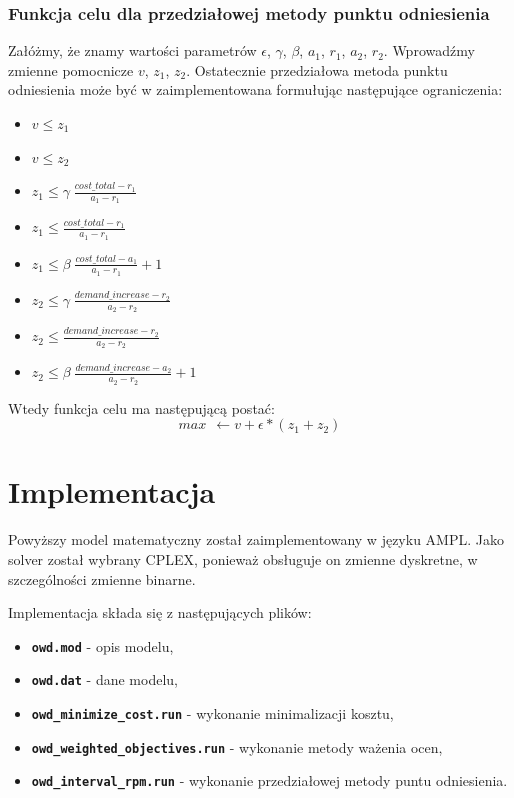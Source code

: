 \documentclass[12pt, twoside, hidelinks, a4paper]{article}
\begin{document}
\subsubsection{Funkcja celu dla przedziałowej metody punktu odniesienia}
Załóżmy, że znamy wartości parametrów $\epsilon$, $\gamma$, $\beta$, $a_1$, $r_1$, $a_2$, $r_2$. Wprowadźmy zmienne pomocnicze $v$, $z_1$, $z_2$. Ostatecznie przedziałowa metoda punktu odniesienia może być w zaimplementowana formułując następujące ograniczenia:
\begin{itemize}
\item $v \leqslant z_1$
\item $v \leqslant z_2$
\item $z_1 \leqslant \gamma \; \frac{cost\_total - r_1}{a_1 - r_1}$
\item $z_1 \leqslant \frac{cost\_total - r_1}{a_1 - r_1}$
\item $z_1 \leqslant \beta \; \frac{cost\_total - a_1}{a_1 - r_1} + 1$
\item $z_2 \leqslant \gamma \; \frac{demand\_increase - r_2}{a_2 - r_2}$
\item $z_2 \leqslant \frac{demand\_increase - r_2}{a_2 - r_2}$
\item $z_2 \leqslant \beta \; \frac{demand\_increase - a_2}{a_2 - r_2} + 1$
\end{itemize}
Wtedy funkcja celu ma następującą postać:
$$max \: \: \leftarrow v + \epsilon * (z_1 + z_2)$$

\section{Implementacja}
Powyższy model matematyczny został zaimplementowany w języku AMPL. Jako solver został wybrany CPLEX, ponieważ obsługuje on zmienne dyskretne, w szczególności zmienne binarne.

Implementacja składa się z następujących plików:
\begin{itemize}
\item \textbf{\texttt{owd.mod}} - opis modelu,
\item \textbf{\texttt{owd.dat}} - dane modelu,
\item \textbf{\texttt{owd\_minimize\_cost.run}} - wykonanie minimalizacji kosztu,
\item \textbf{\texttt{owd\_weighted\_objectives.run}} - wykonanie metody ważenia ocen,
\item \textbf{\texttt{owd\_interval\_rpm.run}} - wykonanie przedziałowej metody puntu odniesienia.
\end{itemize}
\end{document}
